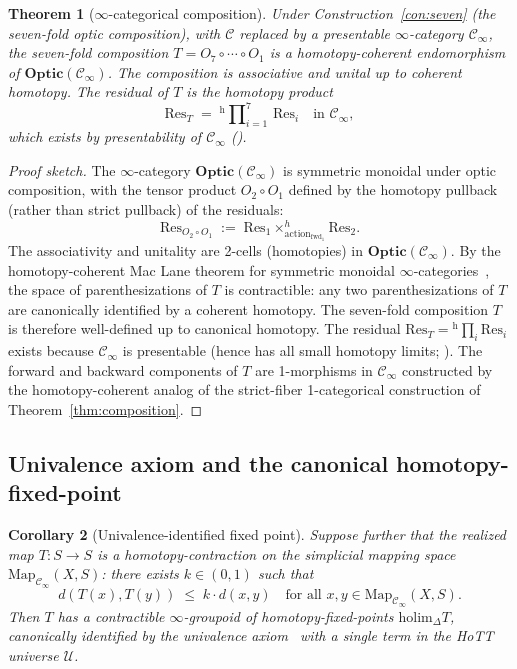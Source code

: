 \documentclass[11pt,a4paper]{article}
\theoremstyle{plain}
\newtheorem{theorem}{Theorem}[section]
\newtheorem{corollary}[theorem]{Corollary}
\theoremstyle{definition}
\theoremstyle{remark}
\newcommand{\Optic}{\mathbf{Optic}}
\begin{document}
\begin{theorem}[$\infty$-categorical composition]
\label{thm:hott-composition}
Under Construction~\ref{con:seven} (the seven-fold optic composition),
with $\mathcal{C}$ replaced by a presentable $\infty$-category
$\mathcal{C}_\infty$, the seven-fold composition $T = O_7 \circ \cdots
\circ O_1$ is a homotopy-coherent endomorphism of
$\Optic(\mathcal{C}_\infty)$. The composition is associative and
unital up to coherent homotopy. The residual of $T$ is the homotopy
product
\[
\mathrm{Res}_T \;=\; {}^{\mathrm{h}}\!\prod\nolimits_{i=1}^{7}\,\mathrm{Res}_i
\quad \text{in } \mathcal{C}_\infty,
\]
which exists by presentability of $\mathcal{C}_\infty$
(\cite[Proposition~5.5.3.1]{lurie2009htt}).
\end{theorem}

\begin{proof}[Proof sketch]
The $\infty$-category $\Optic(\mathcal{C}_\infty)$ is symmetric
monoidal under optic composition, with the tensor product $O_2 \circ
O_1$ defined by the homotopy pullback (rather than strict pullback) of
the residuals:
\[
\mathrm{Res}_{O_2 \circ O_1} \;:=\;
\mathrm{Res}_1 \times^h_{\mathrm{action}_{\mathrm{fwd}_1}} \mathrm{Res}_2.
\]
The associativity and unitality are 2-cells (homotopies) in
$\Optic(\mathcal{C}_\infty)$. By the homotopy-coherent Mac Lane theorem
for symmetric monoidal $\infty$-categories~\cite[Theorem~2.4.3]
{lurie2017ha}, the space of parenthesizations of $T$ is contractible:
any two parenthesizations of $T$ are canonically identified by a
coherent homotopy. The seven-fold composition $T$ is therefore
well-defined up to canonical homotopy. The residual
$\mathrm{Res}_T = {}^{\mathrm{h}}\!\prod_i \mathrm{Res}_i$ exists because
$\mathcal{C}_\infty$ is presentable (hence has all small homotopy
limits; \cite[Proposition~5.5.3.1]{lurie2009htt}). The forward and
backward components of $T$ are 1-morphisms in $\mathcal{C}_\infty$
constructed by the homotopy-coherent analog of the strict-fiber
1-categorical construction of Theorem~\ref{thm:composition}.
\end{proof}

\subsection{Univalence axiom and the canonical homotopy-fixed-point}

\begin{corollary}[Univalence-identified fixed point]
\label{cor:hott-fixedpoint}
Suppose further that the realized map $T : S \to S$ is a
homotopy-contraction on the simplicial mapping space
$\mathrm{Map}_{\mathcal{C}_\infty}(X, S)$: there exists $k \in (0,1)$
such that
\[
d(T(x), T(y)) \;\leq\; k \cdot d(x, y)
\quad \text{for all } x, y \in \mathrm{Map}_{\mathcal{C}_\infty}(X, S).
\]
Then $T$ has a contractible $\infty$-groupoid of homotopy-fixed-points
$\mathrm{holim}_\Delta T$, canonically identified by the univalence
axiom~\cite[\S 2.9--2.10]{hottbook2013} with a single term in the
HoTT universe $\mathcal{U}$.
\end{corollary}
\end{document}
